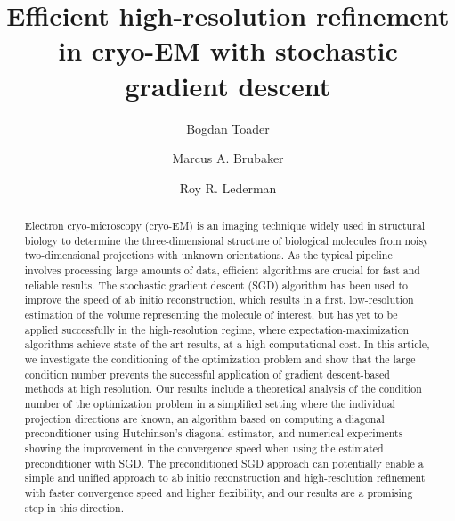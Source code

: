 \documentclass{article}
\title{\vspace{-2cm}Efficient high-resolution refinement in cryo-EM with stochastic gradient descent}
\author[1,2]{Bogdan Toader}
\author[3]{Marcus A. Brubaker}
\author[2]{Roy R. Lederman}
\affil[1]{MRC Laboratory of Molecular Biology}
\affil[2]{Yale University}
\affil[3]{York University}
\begin{document}
 
\maketitle 

\begin{abstract}
Electron cryo-microscopy (cryo-EM) is an imaging technique widely used in structural biology to determine the three-dimensional structure of biological molecules from noisy two-dimensional projections with unknown orientations. As the typical pipeline involves processing large amounts of data, efficient algorithms are crucial for fast and reliable results. The stochastic gradient descent (SGD) algorithm has been used to improve the speed of ab initio reconstruction, which results in a first, low-resolution estimation of the volume representing the molecule of interest, but has yet to be applied successfully in the high-resolution regime, where expectation-maximization algorithms achieve state-of-the-art results, at a high computational cost. In this article, we investigate the conditioning of the optimization problem and show that the large condition number prevents the successful application of gradient descent-based methods at high resolution. Our results include a theoretical analysis of the condition number of the optimization problem in a simplified setting where the individual projection directions are known, an algorithm based on computing a diagonal preconditioner using Hutchinson’s diagonal estimator, and numerical experiments showing the improvement in the convergence speed when using the estimated preconditioner with SGD. The preconditioned SGD approach can potentially enable a simple and unified approach to ab initio reconstruction and high-resolution refinement with faster convergence speed and higher flexibility, and our results are a promising step in this direction.
\end{abstract}
\end{document}
